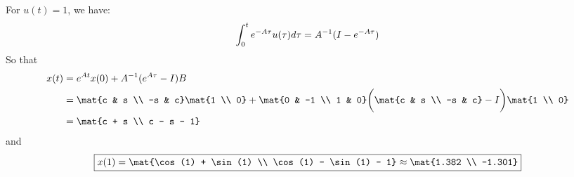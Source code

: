 \documentclass{homework}
\begin{document}
\begin{letterenum}
    \item For $u(t) = 1$, we have:
    \begin{equation}
        \int_{0}^{t} e^{-A\tau} u(\tau) d\tau = A^{-1}(I - e^{-A\tau})
    \end{equation}
    So that
    \begin{align}
        x(t) &= e^{At}x(0) + A^{-1}(e^{A\tau} - I)B \\
            &= \mat{c & s \\ -s & c} \mat{1 \\ 0} + \mat{0 & -1 \\ 1 & 0}
                \biggl(\mat{c & s \\ -s & c} - I\biggr) \mat{1 \\ 0} \\
            &= \mat{c + s \\ c - s - 1}
    \end{align}
    and
    \begin{equation}
        \boxed{x(1) = \mat{\cos(1) + \sin(1) \\ \cos(1) - \sin(1) - 1} \approx \mat{1.382 \\ -1.301}}
    \end{equation}


\end{letterenum}
\end{document}
